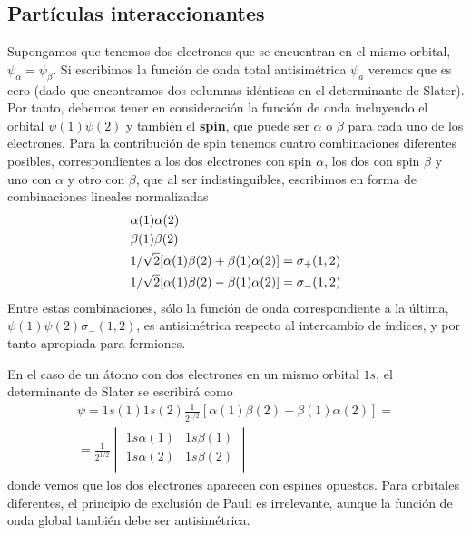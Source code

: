 \subsection{Partículas interaccionantes}
Supongamos que tenemos dos electrones que se encuentran en el mismo
orbital, $\psi_\alpha = \psi_\beta$. Si escribimos la función de onda total
antisimétrica $\psi_a$ veremos que es cero (dado que encontramos dos columnas 
idénticas en el determinante de Slater). Por tanto, debemos tener en consideración
la función de onda incluyendo el orbital $\psi(1)\psi(2)$ y 
también el \textbf{spin}, que puede ser $\alpha$
o $\beta$ para cada uno de los electrones. Para la contribución de spin
tenemos cuatro combinaciones diferentes posibles, correspondientes a 
los dos electrones con spin $\alpha$, los dos
con spin $\beta$ y uno con $\alpha$ y otro con $\beta$,
que al ser indistinguibles, escribimos en forma de combinaciones lineales
normalizadas
\begin{align}
\small
    &\alpha(1)\alpha(2) \\
    &\beta(1)\beta(2) \\
    &1/\sqrt{2}[\alpha(1)\beta(2)+\beta(1)\alpha(2)] = \sigma_{+}(1,2)\\
    &1/\sqrt{2}[\alpha(1)\beta(2)-\beta(1)\alpha(2)] = \sigma_{-}(1,2)
\end{align}
Entre estas combinaciones, sólo la función de onda correspondiente a la
última, $\psi(1)\psi(2)\sigma_{-}(1,2)$, es antisimétrica respecto al 
intercambio de índices, y por tanto apropiada para fermiones. 

En el caso de un átomo con dos electrones en un mismo orbital
$1s$, el determinante de Slater se escribirá como
\begin{equation}
\begin{split}
    \psi = 1s(1)1s(2)\frac{1}{2^{1/2}}[\alpha(1)\beta(2)-\beta(1)\alpha(2)] = \\
=    \frac{1}{2^{1/2}}
    \begin{vmatrix} 
    1s\alpha(1) & 1s\beta(1)   \\
    1s\alpha(2) & 1s\beta(2)  \\
    \end{vmatrix}
    \end{split}
\end{equation}
donde vemos que los dos electrones aparecen con espines opuestos. 
Para orbitales diferentes, el principio de exclusión de Pauli es 
irrelevante, aunque la función de onda global también debe ser
antisimétrica.

